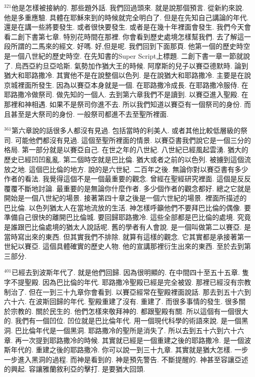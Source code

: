 \documentclass{book}
\begin{document}
$^{321}$他是怎樣被接納的.
那些題外話.
我們回過頭來.
就是說那個預言.
從新約來說.
他是多重應驗.
具體在耶穌來到的時候就完全明白了.
但是在先知自己講論的年代.
還是在講一些將要發生.
或者很快要發生.
或者是在幾十年裡面會發生.
我們今天會看二創下書第七章.
特別花時間在那裡.
你會看到歷史處境怎樣幫我們.
去了解這一段所謂的二馬來的經文.
好嗎.
好,但是呢.
我們回到下面那頁.
他第一個的歷史時空是一個八世紀的歷史時空.
在先知書的Super Script上標題.
二創下書一章一節就說了.
烏西亞約旦亞哈斯.
氣勢加作猶大王的時候.
阿摩斯的兒子以賽亞德默時.
論到猶大和耶路撒冷.
其實他不是在說整個以色列.
是在說猶大和耶路撒冷.
主要是在說京城裡面所發生.
因為以賽亞本身就是一個.
在耶路撒冷成長.
在耶路撒冷服侍.
在耶路撒冷做祭司.
做先知的一個人.
去到第六章我們不是讀到.
以賽亞進入聖殿.
在那裡和神相遇.
如果不是祭司你進不去.
所以我們知道以賽亞有一個祭司的身份.
而且甚至是大祭司的身份.
一般祭司都進不去至聖所裡面.

$^{361}$第六章說的話很多人都沒有見過.
包括當時的利美人.
或者其他比較低層級的祭司.
可能他們都沒有見過.
這個至聖所裡面的情景.
以賽亞書我們說它是一個三分的格局.
第一部分就是以賽亞自己.
在世之年的八世紀.
八世紀已經風起雲湧.
猶大的歷史已經凹凹亂亂.
第二個時空就是巴比倫.
猶大或者之前的以色列.
被擄到這個流放之地.
這個巴比倫的地方.
說的是六世紀.
二百年之後.
無論你對以賽亞書有多少作者的看法.
我覺得這個不是一個最重要的觀念.
曾經在聖經研究裡面.
這個是反反覆覆不斷地討論.
最重要的是無論你什麼作者.
多少個作者的觀念都好.
總之它就是開始是一個八世紀的場景.
接著第四十章之後是一個六世紀的場景.
裡面所描述的巴比倫.
以色列猶太人在當地流放的生活.
神怎樣呼籲他們不要拜巴比倫的偶像.
要準備自己很快的離開巴比倫城.
要回歸耶路撒冷.
這些全部都是巴比倫的處境.
究竟是誰跟巴比倫處境的猶太人說話呢.
舊的學者有人會說.
是一個叫做第二以賽亞.
是當時寫出來的東西.
但其實我們不排除.
就算有這樣的觀念.
它其實都是承接著第一世紀以賽亞.
這個具體確實的歷史人物.
他的宣講那裡衍生出來的東西.
至於去到第三部分.

$^{401}$已經去到波斯年代了.
就是他們回歸.
因為很明顯的.
在中間四十至五十五章.
隻字不提聖殿.
因為巴比倫的年代.
耶路撒冷聖殿已經是完全被毀.
那裡已經沒有宗教制治了.
但在一到三十九章你會看到.
以賽亞經常在聖殿裡面說話.
那去到五十六到六十六.
在波斯回歸的年代.
聖殿重建了沒有.
重建了.
而很多事情的發生.
很多關於宗教的.
關於民生的.
他們怎樣來敬拜神的.
都跟聖殿有關.
所以這個有一個很大的.
我們有一個凹位.
凹位就是巴比倫年代.
用一個現代科學的術語來說.
是一個黑洞.
巴比倫年代是一個黑洞.
耶路撒冷的聖所是消失了.
所以去到五十六到六十六章.
再一次提到耶路撒冷的時候.
其實就已經是一個重建之後的耶路撒冷.
是一個波斯年代的.
重建之後的耶路撒冷.
你可以說一到三十九章.
其實就是猶大怎樣.
一步一步進入黑洞的過程.
而神是看到的.
神是預先警告.
不斷提醒的.
神甚至容讓亞述的興起.
容讓雅蘭敘利亞的擊打.
是要猶大回頭.
\end{document}
